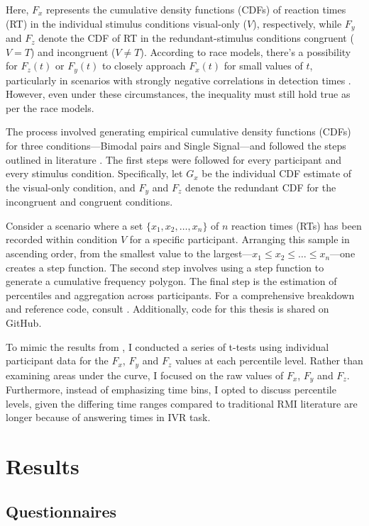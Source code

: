 \documentclass[12pt,oneside,openright]{report}
\begin{document}
Here, $F_x$ represents the cumulative density functions (CDFs) of reaction times (RT) in the individual stimulus conditions visual-only ($V$), respectively, while $F_y$ and $F_z$ denote the CDF of RT in the redundant-stimulus conditions congruent ($V=T$) and incongruent ($V \neq T$). According to race models, there's a possibility for $F_z(t)$ or $F_y(t)$ to closely approach $F_x(t)$ for small values of $t$, particularly in scenarios with strongly negative correlations in detection times \parencite*{Ulrich2007}. However, even under these circumstances, the inequality must still hold true as per the race models.

The process involved generating empirical cumulative density functions (CDFs) for three conditions—Bimodal pairs and Single Signal—and followed the steps outlined in literature \parencite*{Ulrich2007}. The first steps were followed for every participant and every stimulus condition. Specifically, let $G_x$ be the individual CDF estimate of the visual-only condition, and $F_y$ and $F_z$ denote the redundant CDF for the incongruent and congruent conditions.

Consider a scenario where a set $\{x_1, x_2, \ldots , x_n\}$ of $n$ reaction times (RTs) has been recorded within condition $V$ for a specific participant. Arranging this sample in ascending order, from the smallest value to the largest—$x_1 \leq x_2 \leq \ldots \leq x_n$—one creates a step function. The second step involves using a step function to generate a cumulative frequency polygon. The final step is the estimation of percentiles and aggregation across participants. For a comprehensive breakdown and reference code, consult \cite{Ulrich2007}. Additionally, code for this thesis is shared on GitHub.

To mimic the results from \Cite{SALTAFOSSI2023108642}, I conducted a series of t-tests using individual participant data for the $F_x$, $F_y$ and $F_z$ values at each percentile level. Rather than examining areas under the curve, I focused on the raw values of $F_x$, $F_y$ and $F_z$. Furthermore, instead of emphasizing time bins, I opted to discuss percentile levels, given the differing time ranges compared to traditional RMI literature are longer because of answering times in IVR task.

\section*{Results}
\subsection*{Questionnaires}
 
\end{document}
